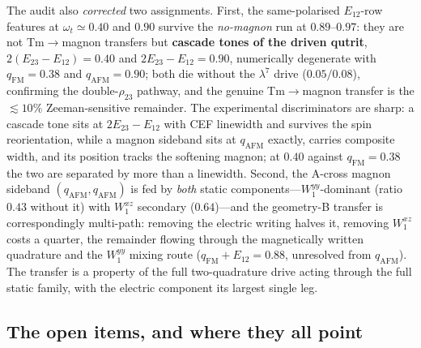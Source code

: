 \documentclass[11pt,a4paper]{article}
\newcommand{\qafm}{q_{\mathrm{AFM}}}
\newcommand{\qfm}{q_{\mathrm{FM}}}
\begin{document}
The audit also \emph{corrected} two assignments.  First, the
same-polarised $E_{12}$-row features at $\omega_t\simeq0.40$ and
$0.90$ survive the \emph{no-magnon} run at $0.89$--$0.97$: they are
not Tm$\to$magnon transfers but \textbf{cascade tones of the driven
qutrit}, $2(E_{23}{-}E_{12})=0.40$ and $2E_{23}{-}E_{12}=0.90$,
numerically degenerate with $\qfm=0.38$ and $\qafm=0.90$; both die
without the $\lambda^7$ drive ($0.05/0.08$), confirming the
double-$\rho_{23}$ pathway, and the genuine Tm$\to$magnon transfer is
the $\lesssim10\%$ Zeeman-sensitive remainder.  The experimental
discriminators are sharp: a cascade tone sits at $2E_{23}-E_{12}$
with CEF linewidth and survives the spin reorientation, while a
magnon sideband sits at $\qafm$ exactly, carries composite width, and
its position tracks the softening magnon; at $0.40$ against
$\qfm=0.38$ the two are separated by more than a linewidth.  Second,
the A-cross magnon sideband $(\qafm,\qafm)$ is fed by \emph{both}
static components---$W^{yy}_1$-dominant (ratio $0.43$ without it)
with $W^{xz}_1$ secondary ($0.64$)---and the geometry-B transfer is
correspondingly multi-path: removing the electric writing halves it,
removing $W^{xz}_1$ costs a quarter, the remainder flowing through
the magnetically written quadrature and the $W^{yy}_1$ mixing route
($\qfm+E_{12}=0.88$, unresolved from $\qafm$).  The transfer is a
property of the full two-quadrature drive acting through the full
static family, with the electric component its largest single leg.

\subsection{The open items, and where they all point}
\label{sec:openitem}
\end{document}
